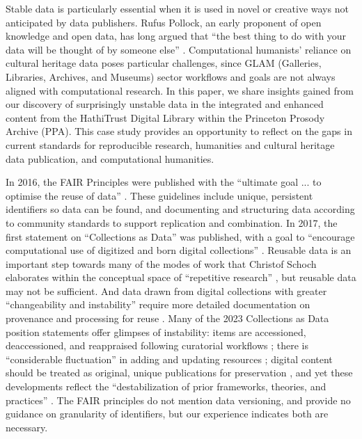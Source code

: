 \documentclass[final]{anthology-ch} %
\begin{document}
Stable data is particularly essential when it is used in novel or creative ways not anticipated by data publishers. Rufus Pollock, an early proponent of open knowledge and open data, has long argued that ``the best thing to do with your data will be thought of by someone else'' \cite{pollock_open_2011}. Computational humanists’ reliance on cultural heritage data poses particular challenges, since GLAM (Galleries, Libraries, Archives, and Museums) sector workflows and goals are not always aligned with computational research. In this paper, we share insights gained from our discovery of surprisingly unstable data in the integrated and enhanced content from the HathiTrust Digital Library within the Princeton Prosody Archive (PPA). This case study provides an opportunity to reflect on the gaps in current standards for reproducible research,  humanities and cultural heritage data publication, and computational humanities. 

In 2016, the FAIR Principles were published with the ``ultimate goal ... to optimise the reuse of data'' \autocite{noauthor_fair_nodate}. These guidelines include unique, persistent identifiers so data can be found, and documenting and structuring data according to community standards to support replication and combination.  In 2017, the first statement on ``Collections as Data'' was published, with a goal to  ``encourage computational use of digitized and born digital collections'' \autocite{noauthor_santa_nodate}. Reusable data is an important step towards many of the modes of work that Christof Schoch elaborates within the conceptual space of ``repetitive research'' \autocite{schoch_repetitive_2023}, but reusable data may not be sufficient. And data drawn from digital collections with greater ``changeability and instability'' require more detailed documentation on provenance and processing for reuse \autocite{burrows_reproducibility_2023}.  Many of the 2023 Collections as Data position statements offer glimpses of instability: items are accessioned, deaccessioned, and reappraised following curatorial workflows \autocite{knazook_building_2023}; there is ``considerable fluctuation'' in adding and updating resources \autocite{neudecker_collections_2023}; digital content should be treated as original, unique publications for preservation \autocite{steven_no_2023, roke_moving_2023}, and yet these developments reflect the ``destabilization of prior frameworks, theories, and practices'' \autocite{bailey_collections_2023}. The FAIR principles do not mention data versioning, and provide no guidance on granularity of identifiers, but our experience indicates both are necessary.
\end{document}
